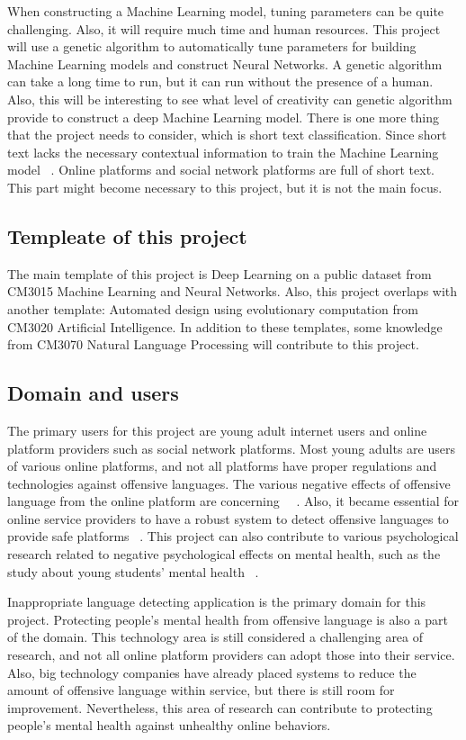 \documentclass[11pt, natbib=false]{article}
\begin{document}
When constructing a Machine Learning model, tuning parameters can be quite challenging.
Also, it will require much time and human resources.
This project will use a genetic algorithm to automatically tune parameters for building Machine Learning models and construct Neural Networks.
A genetic algorithm can take a long time to run, but it can run without the presence of a human.
Also, this will be interesting to see what level of creativity can genetic algorithm provide to construct a deep Machine Learning model.
There is one more thing that the project needs to consider, which is short text classification.
Since short text lacks the necessary contextual information to train the Machine Learning model ~\cite{wang2021short}.
Online platforms and social network platforms are full of short text.
This part might become necessary to this project, but it is not the main focus. 

\subsection{Templeate of this project}
The main template of this project is Deep Learning on a public dataset from CM3015 Machine Learning and Neural Networks. Also, this project overlaps with another template: Automated design using evolutionary computation from CM3020 Artificial Intelligence. In addition to these templates, some knowledge from CM3070 Natural Language Processing will contribute to this project. 

\subsection{Domain and users}
The primary users for this project are young adult internet users and online platform providers such as social network platforms.
Most young adults are users of various online platforms, and not all platforms have proper regulations and technologies against offensive languages.
The various negative effects of offensive language from the online platform are concerning ~\cite{babvey2021using}~\cite{shi2021influence}.
Also, it became essential for online service providers to have a robust system to detect offensive languages to provide safe platforms ~\cite{vidgen2019challenges}.
This project can also contribute to various psychological research related to negative psychological effects on mental health, such as the study about young students’ mental health ~\cite{shi2021influence}.

Inappropriate language detecting application is the primary domain for this project.
Protecting people’s mental health from offensive language is also a part of the domain.
This technology area is still considered a challenging area of research, and not all online platform providers can adopt those into their service.
Also, big technology companies have already placed systems to reduce the amount of offensive language within service, but there is still room for improvement.
Nevertheless, this area of research can contribute to protecting people’s mental health against unhealthy online behaviors. 
\end{document}
